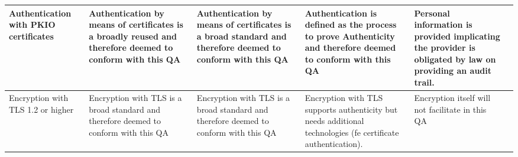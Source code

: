 \begin{longtable}[c]{|p{3cm}|p{3cm}|p{3cm}|p{3cm}|p{3cm}|p{3cm}|}
 \hline
  Authentication with PKIO certificates & Authentication by means of certificates is a broadly reused and therefore deemed to conform with this QA & Authentication by means of certificates is a broad standard and therefore deemed to conform with this QA & Authentication is defined as the process to prove Authenticity and therefore deemed to conform with this QA & Personal information is provided implicating the provider is obligated by law \cite{GDPR} on providing an audit trail.\\
 \hline
 Encryption with TLS 1.2 or higher & Encryption with TLS is a broad standard and therefore deemed to conform with this QA & Encryption with TLS is a broad standard and therefore deemed to conform with this QA & Encryption with TLS supports authenticity but needs additional technologies (fe certificate authentication).  & Encryption itself will not facilitate in this QA \\
 \hline
\end{longtable}




